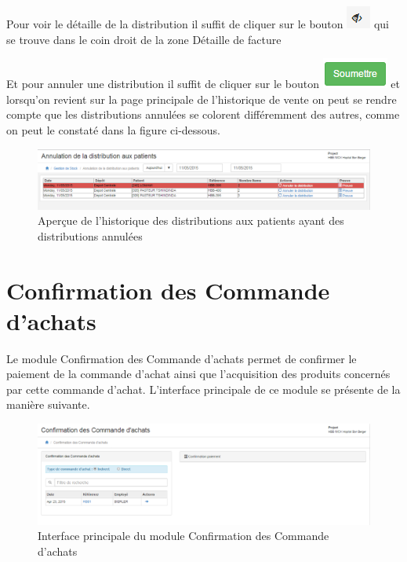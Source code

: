 \documentclass[12pt,a4paper]{report}
\begin{document}
Pour voir le détaille de la distribution il suffit de cliquer sur le bouton \includegraphics[scale=0.7]{pic/SeeInvoice.png} qui se trouve dans le coin droit de la zone Détaille de facture   


Et pour annuler une distribution il suffit de cliquer sur le bouton \includegraphics[scale=0.7]{pic/soumettreGreen.png} et lorsqu'on revient sur la page principale de l'historique de vente on peut se rendre compte que les distributions annulées se colorent différemment des autres, comme on peut le constaté dans la figure ci-dessous.

\begin{figure}[h]
\begin{center}
\includegraphics[width=14cm]{pic/CancelDistPatientView.png}
\end{center}
\caption{Aperçue de l'historique des distributions aux patients ayant des distributions annulées}
\label{Aperçue de l'historique des distributions aux patients ayant des distributions annulées}
\end{figure}


\newpage
\section{Confirmation des Commande d'achats}
Le module Confirmation des Commande d'achats permet de confirmer le paiement de la commande d'achat ainsi que l'acquisition des produits concernés par cette commande d'achat. L'interface principale de ce module se présente de la manière suivante.

\begin{figure}[h]
\begin{center}
\includegraphics[width=12cm]{pic/ConfPaieAchat.png}
\end{center}
\caption{Interface principale du module Confirmation des Commande d'achats}
\label{Interface principale du module Confirmation des Commande d'achats}
\end{figure}  
\end{document}

